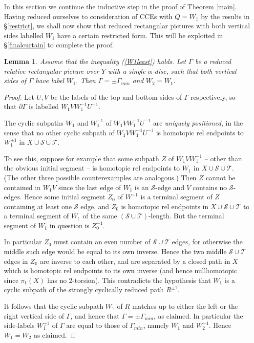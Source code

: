 \documentclass[12pt,a4paper]{amsart}
\def\G{\Gamma}
\def\a{\alpha}
\def\cS{\mathcal{S}}
\def\cT{\mathcal{T}}
\newtheorem{lem}[thm]{Lemma}
\begin{document}
In this section we continue the inductive step in the proof of Theorem \ref{main}.  
Having reduced ourselves to consideration of CCEs with $Q=W_1$ by the results in \S \ref{restrict},  
we shall now show that reduced rectangular pictures with both vertical sides labelled $W_1$
have a certain restricted form. 
This will be exploited in \S \ref{finalcurtain} to complete the proof.



\begin{lem}\label{l:3} 
	Assume that the inequality (\ref{W1least}) holds.
	Let $\G$ be a reduced relative rectangular   picture
	over $Y$ with a single $\a$-disc, 
	such that both vertical sides of $\G$ have label $W_1$.  
	Then $\G=\pm\G_{min}$ and $W_2=W_1$.
\end{lem}

\begin{proof}
	Let $U,V$ be the labels of the top and bottom sides of $\G$ respectively, so that $\partial\G$ is labelled 
	$W_1VW_1^{-1}U^{-1}$.
	
	The cyclic  subpaths	$W_1$   and $W_1^{-1}$ of $W_1VW_1^{-1}U^{-1}$ 
	 are  {\em uniquely positioned}, 
	in the sense that no other cyclic subpath   
	of $W_1VW_1^{-1}U^{-1}$ is homotopic rel endpoints to  $W_1^{\pm1}$  in $X\cup\cS\cup\cT$.
 
		To see this, suppose for example that some subpath $Z$ of $W_1VW_1^{-1}$ -- other than the obvious initial segment -- is homotopic rel endpoints to $W_1$ in $X\cup\cS\cup\cT$.  (The other three possible counterexamples are analogous.)   Then $Z$ cannot be contained in $W_1V$ since the last edge of $W_1$ is an $\cS$-edge and $V$ contains no $\cS$-edges.   Hence some initial segment $Z_0$ of $W^{-1}$ is a terminal segment of $Z$ containing at least one $\cS$ edge, and $Z_0$ is homotopic rel endpoints in $X\cup\cS\cup\cT$ to a terminal segment of $W_1$ of the same $(\cS\cup\cT)$-length. But the terminal segment of $W_1$ in question is $Z_0^{-1}$. 
		
		In particular $Z_0$ must contain an even number of $\cS\cup\cT$ edges, for otherwise the middle such edge would be equal to its own inverse.    Hence the two middle $\cS\cup\cT$ edges in $Z_0$ are inverse to each other, and are separated by a closed path in $X$ which is homotopic rel endpoints to its own inverse (and hence nullhomotopic since $\pi_1(X)$ has no $2$-torsion).  This contradicts the hypothesis that $W_1$ is a cyclic subpath of the strongly cyclically reduced path $R^{\pm1}$.
	  
	
	It follows that the {cyclic subpath} 
	$W_1$ of $R$ matches up to either the left or the right vertical side of $\G$, 
	and hence that $\G=\pm\G_{min}$, as claimed. 
In particular the side-labels $W_1^{\pm1}$ of $\G$ are equal to those of $\G_{min}$, namely  $W_1$ and $W_2^{-1}$.   Hence $W_1=W_2$ as claimed.
\end{proof}
\end{document}
